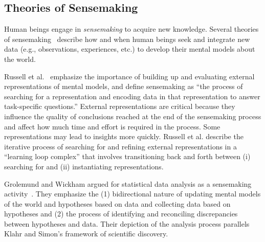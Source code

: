 \figurePriorWorkCombined

\subsection{Theories of Sensemaking}
Human beings engage in \textit{sensemaking} to acquire new knowledge. Several
theories of
sensemaking~\cite{pirolli2005sensemaking,russell1993cost,klein2007dataFrame}
describe how and when human beings seek and integrate new data (e.g.,
observations, experiences, etc.) to develop their mental models about the world.

Russell et al.~\cite{russell1993cost} emphasize the importance of building up
and evaluating external representations of mental models, and define sensemaking
as ``the process of searching for a representation and encoding data in that
representation to answer task-specific questions.'' External representations are
critical because they influence the quality of conclusions reached at the end of
the sensemaking process and affect how much time and effort is required in the process. Some representations
may lead to insights more quickly. Russell et al. describe the iterative
process of searching for and refining external representations in a ``learning
loop complex'' that involves transitioning back and forth between (i) searching
for and (ii) instantiating representations. 
 
Grolemund and Wickham argued for statistical data analysis as a sensemaking
activity~\cite{grolemund2014cognitive}. They emphasize the (1)
bidirectional nature of updating mental models of the world and hypotheses based
on data and collecting data based on hypotheses and (2) the process of
identifying and reconciling discrepancies between hypotheses and data. Their
depiction of the analysis process parallels Klahr and Simon's framework of
scientific discovery.


